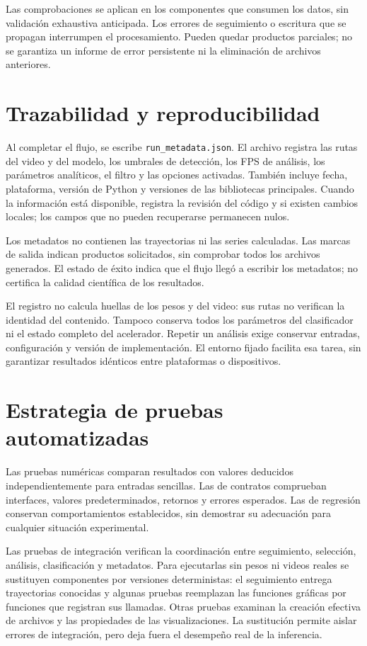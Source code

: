 Las comprobaciones se aplican en los componentes que consumen los datos, sin validación exhaustiva anticipada. Los errores de seguimiento o escritura que se propagan interrumpen el procesamiento. Pueden quedar productos parciales; no se garantiza un informe de error persistente ni la eliminación de archivos anteriores.

\section{Trazabilidad y reproducibilidad}

Al completar el flujo, se escribe \texttt{run\_metadata.json}. El archivo registra las rutas del video y del modelo, los umbrales de detección, los FPS de análisis, los parámetros analíticos, el filtro y las opciones activadas. También incluye fecha, plataforma, versión de Python y versiones de las bibliotecas principales. Cuando la información está disponible, registra la revisión del código y si existen cambios locales; los campos que no pueden recuperarse permanecen nulos.

Los metadatos no contienen las trayectorias ni las series calculadas. Las marcas de salida indican productos solicitados, sin comprobar todos los archivos generados. El estado de éxito indica que el flujo llegó a escribir los metadatos; no certifica la calidad científica de los resultados.

El registro no calcula huellas de los pesos y del video: sus rutas no verifican la identidad del contenido. Tampoco conserva todos los parámetros del clasificador ni el estado completo del acelerador. Repetir un análisis exige conservar entradas, configuración y versión de implementación. El entorno fijado facilita esa tarea, sin garantizar resultados idénticos entre plataformas o dispositivos.

\section{Estrategia de pruebas automatizadas}

Las pruebas numéricas comparan resultados con valores deducidos independientemente para entradas sencillas. Las de contratos comprueban interfaces, valores predeterminados, retornos y errores esperados. Las de regresión conservan comportamientos establecidos, sin demostrar su adecuación para cualquier situación experimental.

Las pruebas de integración verifican la coordinación entre seguimiento, selección, análisis, clasificación y metadatos. Para ejecutarlas sin pesos ni videos reales se sustituyen componentes por versiones deterministas: el seguimiento entrega trayectorias conocidas y algunas pruebas reemplazan las funciones gráficas por funciones que registran sus llamadas. Otras pruebas examinan la creación efectiva de archivos y las propiedades de las visualizaciones. La sustitución permite aislar errores de integración, pero deja fuera el desempeño real de la inferencia.

